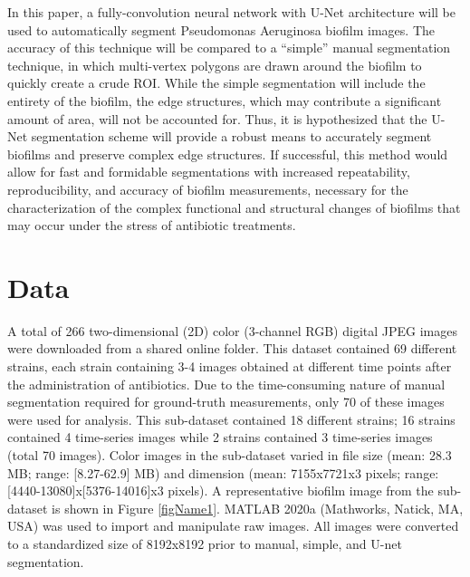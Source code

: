 \documentclass[conference]{IEEEtran}
\begin{document}
In this paper, a fully-convolution neural network with U-Net architecture will be used to automatically segment Pseudomonas Aeruginosa biofilm images. The accuracy of this technique will be compared to a “simple” manual segmentation technique, in which multi-vertex polygons are drawn around the biofilm to quickly create a crude ROI. While the simple segmentation will include the entirety of the biofilm, the edge structures, which may contribute a significant amount of area, will not be accounted for. Thus, it is hypothesized that the U-Net segmentation scheme will provide a robust means to accurately segment biofilms and preserve complex edge structures. If successful, this method would allow for fast and formidable segmentations with increased repeatability, reproducibility, and accuracy of biofilm measurements, necessary for the characterization of the complex functional and structural changes of biofilms that may occur under the stress of antibiotic treatments.

\section{Data}
A total of 266 two-dimensional (2D) color (3-channel RGB) digital JPEG images were downloaded from a shared online folder. This dataset contained 69 different strains, each strain containing 3-4 images obtained at different time points after the administration of antibiotics. Due to the time-consuming nature of manual segmentation required for ground-truth measurements, only 70 of these images were used for analysis. This sub-dataset contained 18 different strains; 16 strains contained 4 time-series images while 2 strains contained 3 time-series images (total 70 images). Color images in the sub-dataset varied in file size (mean: 28.3 MB; range: [8.27-62.9] MB) and dimension (mean: 7155x7721x3 pixels; range: [4440-13080]x[5376-14016]x3 pixels). A representative biofilm image from the sub-dataset is shown in Figure \ref{figName1}. MATLAB 2020a (Mathworks, Natick, MA, USA) was used to import and manipulate raw images. All images were converted to a standardized size of 8192x8192 prior to manual, simple, and U-net segmentation. 
\end{document}
